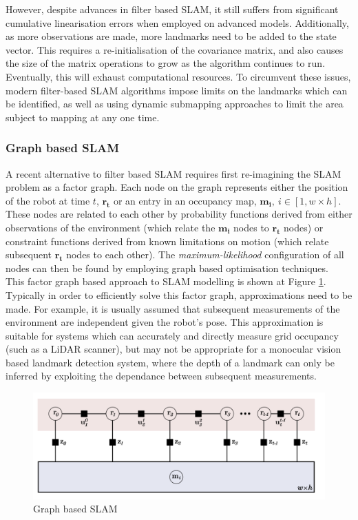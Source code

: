\documentclass[capstone_report.tex]{subfiles}
\begin{document}
However, despite advances in filter based SLAM, it still suffers from significant cumulative linearisation errors when employed on advanced models. Additionally, as more observations are made, more landmarks need to be added to the state vector. This requires a re-initialisation of the covariance matrix, and also causes the size of the matrix operations to grow as the algorithm continues to run. Eventually, this will exhaust computational resources. To circumvent these issues, modern filter-based SLAM algorithms impose limits on the landmarks which can be identified, as well as using dynamic submapping approaches to limit the area subject to mapping at any one time.

\subsubsection{Graph based SLAM}
A recent alternative to filter based SLAM requires first re-imagining the SLAM problem as a factor graph. Each node on the graph represents either the position of the robot at time $t$, $\bm{r_t}$ or an entry in an occupancy map, $\bm{m_i}, \ i\in[1,w\times h]$. These nodes are related to each other by probability functions derived from either observations of the environment (which relate the $\bm{m_i}$ nodes to $\bm{r_t}$ nodes) or constraint functions derived from known limitations on motion (which relate subsequent $\bm{r_t}$ nodes to each other). The \emph{maximum-likelihood} configuration of all nodes can then be found by employing graph based optimisation techniques. \\

This factor graph based approach to SLAM modelling is shown at Figure \ref{fig:graphSlam1}. Typically in order to efficiently solve this factor graph, approximations need to be made. For example, it is usually assumed that subsequent measurements of the environment are independent given the robot's pose. This approximation is suitable for systems which can accurately and directly measure grid occupancy (such as a LiDAR scanner), but may not be appropriate for a monocular vision based landmark detection system, where the depth of a landmark can only be inferred by exploiting the dependance between subsequent measurements.

\begin{figure}[H]
    \centering
    \includegraphics[width=1\textwidth]{imgs/placeholderDiagram.png}
    \caption{Graph based SLAM\label{fig:graphSlam1}}
\end{figure}
\end{document}

